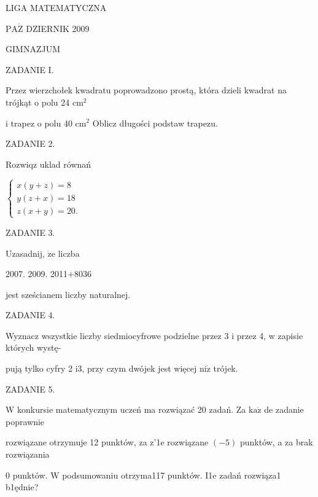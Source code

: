 \documentclass[a4paper,12pt]{article}
\begin{document}
LIGA MATEMATYCZNA

$\mathrm{P}\mathrm{A}\acute{\mathrm{Z}}$ DZIERNIK 2009

GIMNAZJUM

ZADANIE I.

Przez wierzchołek kwadratu poprowadzono prostą, która dzieli kwadrat na trójkąt o polu 24 $\mathrm{c}\mathrm{m}^{2}$

i trapez o polu 40 $\mathrm{c}\mathrm{m}^{2}$ Oblicz długości podstaw trapezu.

ZADANIE 2.

Rozwiqz uklad równań

$\left\{\begin{array}{l}
x(y+z)=8\\
y(z+x)=18\\
z(x+y)=20.
\end{array}\right.$

ZADANIE 3.

Uzasadnij, $\dot{\mathrm{z}}\mathrm{e}$ liczba

2007. 2009. 2011$+$8036

jest sześcianem liczby naturalnej.

ZADANIE 4.

Wyznacz wszystkie liczby siedmiocyfrowe podzielne przez 3 i przez 4, w zapisie których wystę-

pują tylko cyfry 2 $\mathrm{i}3$, przy czym dwójek jest więcej $\mathrm{n}\mathrm{i}\dot{\mathrm{z}}$ trójek.

ZADANIE 5.

$\mathrm{W}$ konkursie matematycznym uczeń ma rozwiązać 20 zadań. Za $\mathrm{k}\mathrm{a}\dot{\mathrm{z}}$ de zadanie poprawnie

rozwiązane otrzymuje 12 punktów, za z'1e rozwiązane $(-5)$ punktów, a za brak rozwiązania

0 punktów. $\mathrm{W}$ podsumowaniu otrzyma117 punktów. I1e zadań rozwiąza1 b1ędnie?
\end{document}
